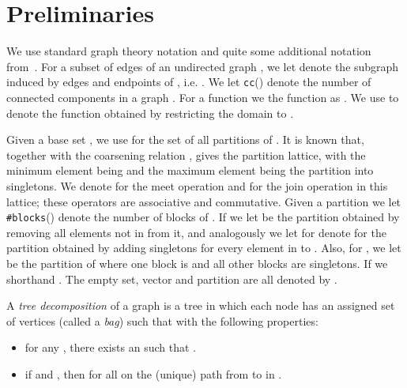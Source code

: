\documentclass{llncs}
\begin{document}
\section{Preliminaries}\label{prelim}
We use standard graph theory notation and quite some additional notation from~\cite{BodlaenderCKN12}. 
For a subset of edges  of an undirected graph ,
we let  denote the subgraph induced by edges and endpoints of , i.e. . We let \texttt{cc}() denote the number of connected components in a graph .
For a function  we the function  as . We use  to denote the function obtained by restricting the domain to .

Given a base set , we use  for the set of all partitions of . It is known that, together with the coarsening relation ,  gives the partition lattice, with the minimum element being  and the maximum element being the partition into singletons. We denote  for the meet operation and  for the join operation in this lattice; these operators are associative and commutative. Given a partition  we let \texttt{\#blocks}() denote the number of blocks of . If  we let  be the partition obtained by removing all elements not in  from it, and analogously we let for  denote  for the partition obtained by adding singletons for every element in  to . Also, for , we let  be the partition of  where one block is  and all other blocks are singletons. If  we shorthand . The empty set, vector and partition are all denoted by . 

\begin{definition}
A \emph{tree decomposition}  of a graph  is a tree  in which each node  has an assigned set of vertices  (called a \emph{bag}) such that  with the following properties:
\begin{itemize}
\item for any , there exists an  such that .
\item if  and , then  for all  on the (unique) path from  to  in .
\end{itemize}
\end{definition}
\end{document}
